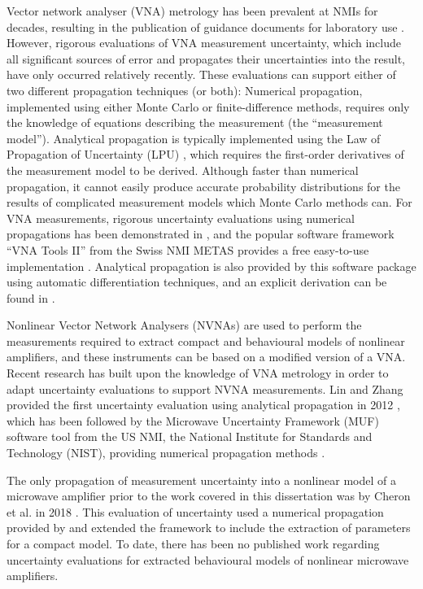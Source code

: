 \documentclass[../thesis/thesis.tex]{subfiles}
\begin{document}
Vector network analyser (VNA) metrology has been prevalent at NMIs for decades, resulting in the publication of guidance documents for laboratory use \cite{EA_2000,EURAMET_2011}. However, rigorous evaluations of VNA measurement uncertainty, which include all significant sources of error and propagates their uncertainties into the result, have only occurred relatively recently. These evaluations can support either of two different propagation techniques (or both): Numerical propagation, implemented using either Monte Carlo or finite-difference methods, requires only the knowledge of equations describing the measurement (the ``measurement model''). Analytical propagation is typically implemented using the Law of Propagation of Uncertainty (LPU) \cite{GUM_2008}, which requires the first-order derivatives of the measurement model to be derived. Although faster than numerical propagation, it cannot easily produce accurate probability distributions for the results of complicated measurement models which Monte Carlo methods can. For VNA measurements, rigorous uncertainty evaluations using numerical propagations has been demonstrated in \cite{Hoffman_2007}, and the popular software framework ``VNA Tools II'' from the Swiss NMI METAS provides a free easy-to-use implementation \cite{VNATools}. Analytical propagation is also provided by this software package using automatic differentiation techniques, and an explicit derivation can be found in \cite{Lewandowski_2010B}.

Nonlinear Vector Network Analysers (NVNAs) are used to perform the measurements required to extract compact and behavioural models of nonlinear amplifiers, and these instruments can be based on a modified version of a VNA. Recent research has built upon the knowledge of VNA metrology in order to adapt uncertainty evaluations to support NVNA measurements. Lin and Zhang provided the first uncertainty evaluation using analytical propagation in 2012 \cite{Lin_2012}, which has been followed by the Microwave Uncertainty Framework (MUF) software tool from the US NMI, the National Institute for Standards and Technology (NIST), providing numerical propagation methods \cite{MUFWebsite,Avolio_2015}.

The only propagation of measurement uncertainty into a nonlinear model of a microwave amplifier prior to the work covered in this dissertation was by Cheron et al. in 2018 \cite{Cheron_2018}. This evaluation of uncertainty used a numerical propagation provided by \cite{MUFWebsite} and extended the framework to include the extraction of parameters for a compact model. To date, there has been no published work regarding uncertainty evaluations for extracted behavioural models of nonlinear microwave amplifiers.
\end{document}
